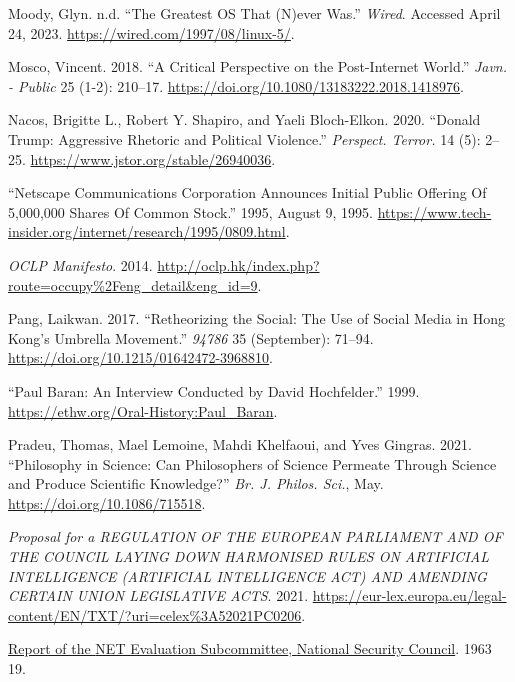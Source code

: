 \documentclass[
  a4paper,
]{book}
\newlength{\cslhangindent}
\newlength{\cslentryspacingunit} %
\newenvironment{CSLReferences}[2] %
 {%
  \setlength{\parindent}{0pt}
  \ifodd #1
  \let\oldpar\par
  \def\par{\hangindent=\cslhangindent\oldpar}
  \fi
  \setlength{\parskip}{#2\cslentryspacingunit}
 }%
 {}
\begin{document}
\begin{CSLReferences}{1}{0}
\hypertarget{ref-moodyGreatestOSThat}{}
Moody, Glyn. n.d. {``The {Greatest OS That} ({N})ever {Was}.''} \emph{Wired}. Accessed April 24, 2023. \url{https://wired.com/1997/08/linux-5/}.

\hypertarget{ref-moscoCriticalPerspectivePostInternet2018}{}
Mosco, Vincent. 2018. {``A {Critical Perspective} on the {Post-Internet World}.''} \emph{Javn. - Public} 25 (1-2): 210--17. \url{https://doi.org/10.1080/13183222.2018.1418976}.

\hypertarget{ref-nacosDonaldTrumpAggressive2020}{}
Nacos, Brigitte L., Robert Y. Shapiro, and Yaeli Bloch-Elkon. 2020. {``Donald {Trump}: {Aggressive Rhetoric} and {Political Violence}.''} \emph{Perspect. Terror.} 14 (5): 2--25. \url{https://www.jstor.org/stable/26940036}.

\hypertarget{ref-NetscapeCommunicationsCorporation1995}{}
{``Netscape {Communications Corporation Announces Initial Public Offering Of} 5,000,000 {Shares Of Common Stock}.''} 1995, August 9, 1995. \url{https://www.tech-insider.org/internet/research/1995/0809.html}.

\hypertarget{ref-OCLPManifesto2014}{}
\emph{{OCLP Manifesto}}. 2014. \url{http://oclp.hk/index.php?route=occupy\%2Feng_detail\&eng_id=9}.

\hypertarget{ref-pangRetheorizingSocialUse2017}{}
Pang, Laikwan. 2017. {``Retheorizing the {Social}: {The Use} of {Social Media} in {Hong Kong}'s {Umbrella Movement}.''} \emph{94786} 35 (September): 71--94. \url{https://doi.org/10.1215/01642472-3968810}.

\hypertarget{ref-barnPaulBaranInterview1999}{}
{``Paul {Baran}: {An Interview Conducted} by {David Hochfelder}.''} 1999. \url{https://ethw.org/Oral-History:Paul_Baran}.

\hypertarget{ref-pradeuPhilosophyScienceCan2021}{}
Pradeu, Thomas, Mael Lemoine, Mahdi Khelfaoui, and Yves Gingras. 2021. {``Philosophy in {Science}: {Can} Philosophers of Science Permeate Through Science and Produce Scientific Knowledge?''} \emph{Br. J. Philos. Sci.}, May. \url{https://doi.org/10.1086/715518}.

\hypertarget{ref-ProposalREGULATIONEUROPEAN2021}{}
\emph{Proposal for a {REGULATION OF THE EUROPEAN PARLIAMENT AND OF THE COUNCIL LAYING DOWN HARMONISED RULES ON ARTIFICIAL INTELLIGENCE} ({ARTIFICIAL INTELLIGENCE ACT}) {AND AMENDING CERTAIN UNION LEGISLATIVE ACTS}}. 2021. \url{https://eur-lex.europa.eu/legal-content/EN/TXT/?uri=celex\%3A52021PC0206}.

\hypertarget{ref-ReportNETEvaluation1963}{}
\href{https://nsarchive.gwu.edu/document/28620-document-12-1963-report-net-evaluation-subcommittee-national-security-council-oral}{Report of the {NET Evaluation Subcommittee}, {National Security Council}}. 1963 19.


\end{CSLReferences}
\end{document}
